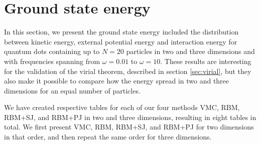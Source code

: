 \newpage
\section{Ground state energy} \label{sec:energydistribution}
In this section, we present the ground state energy included the distribution between kinetic energy, external potential energy and interaction energy for quantum dots containing up to $N=20$ particles in two and three dimensions and with frequencies spanning from $\omega=0.01$ to $\omega=10$. These results are interesting for the validation of the virial theorem, described in section \ref{sec:virial}, but they also make it possible to compare how the energy spread in two and three dimensions for an equal number of particles.

We have created respective tables for each of our four methods VMC, RBM, RBM+SJ, and RBM+PJ in two and three dimensions, resulting in eight tables in total. We first present VMC, RBM, RBM+SJ, and RBM+PJ for two dimensions in that order, and then repeat the same order for three dimensions.

